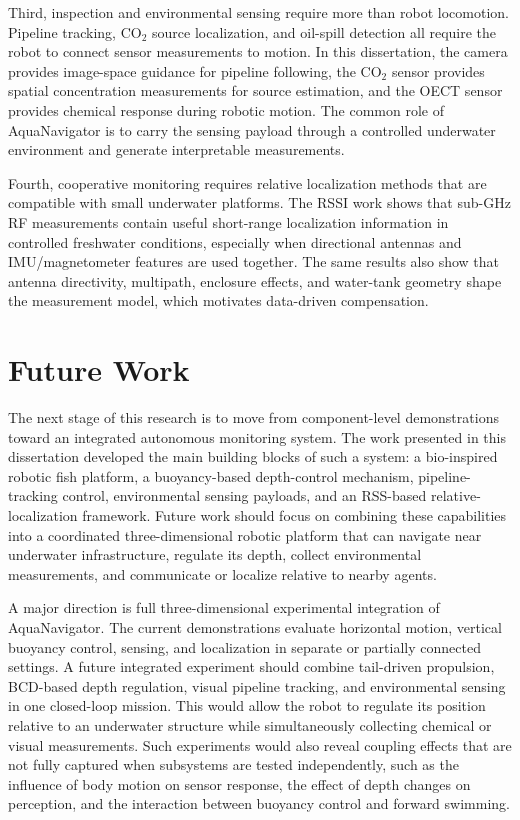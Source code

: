 \documentclass{uhcoethesis}
\begin{document}
Third, inspection and environmental sensing require more than robot locomotion. Pipeline tracking, \mbox{CO$_2$} source localization, and oil-spill detection all require the robot to connect sensor measurements to motion. In this dissertation, the camera provides image-space guidance for pipeline following, the \mbox{CO$_2$} sensor provides spatial concentration measurements for source estimation, and the OECT sensor provides chemical response during robotic motion. The common role of AquaNavigator is to carry the sensing payload through a controlled underwater environment and generate interpretable measurements.

Fourth, cooperative monitoring requires relative localization methods that are compatible with small underwater platforms. The RSSI work shows that sub-GHz RF measurements contain useful short-range localization information in controlled freshwater conditions, especially when directional antennas and IMU/magnetometer features are used together. The same results also show that antenna directivity, multipath, enclosure effects, and water-tank geometry shape the measurement model, which motivates data-driven compensation.

\section{Future Work}

The next stage of this research is to move from component-level demonstrations toward an integrated autonomous monitoring system. The work presented in this dissertation developed the main building blocks of such a system: a bio-inspired robotic fish platform, a buoyancy-based depth-control mechanism, pipeline-tracking control, environmental sensing payloads, and an RSS-based relative-localization framework. Future work should focus on combining these capabilities into a coordinated three-dimensional robotic platform that can navigate near underwater infrastructure, regulate its depth, collect environmental measurements, and communicate or localize relative to nearby agents.

A major direction is full three-dimensional experimental integration of AquaNavigator. The current demonstrations evaluate horizontal motion, vertical buoyancy control, sensing, and localization in separate or partially connected settings. A future integrated experiment should combine tail-driven propulsion, BCD-based depth regulation, visual pipeline tracking, and environmental sensing in one closed-loop mission. This would allow the robot to regulate its position relative to an underwater structure while simultaneously collecting chemical or visual measurements. Such experiments would also reveal coupling effects that are not fully captured when subsystems are tested independently, such as the influence of body motion on sensor response, the effect of depth changes on perception, and the interaction between buoyancy control and forward swimming.
\end{document}
